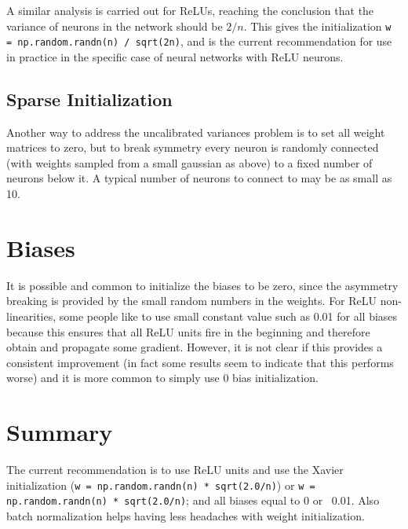 A similar analysis is carried out for ReLUs, reaching the conclusion that the variance of neurons in the network should be $2/n$. This gives the initialization \texttt{w = np.random.randn(n) / sqrt(2n)}, and is the current recommendation for use in practice in the specific case of neural networks with ReLU neurons.

\subsection*{Sparse Initialization}
Another way to address the uncalibrated variances problem is to set all weight matrices to zero, but to break symmetry every neuron is randomly connected (with weights sampled from a small gaussian as above) to a fixed number of neurons below it. A typical number of neurons to connect to may be as small as 10.

\section{Biases}
It is possible and common to initialize the biases to be zero, since the asymmetry breaking is provided by the small random numbers in the weights. For ReLU non-linearities, some people like to use small constant value such as 0.01 for all biases because this ensures that all ReLU units fire in the beginning and therefore obtain and propagate some gradient. However, it is not clear if this provides a consistent improvement (in fact some results seem to indicate that this performs worse) and it is more common to simply use 0 bias initialization.

\section*{Summary}
The current recommendation is to use ReLU units and use the Xavier initialization (\texttt{w = np.random.randn(n) * sqrt(2.0/n)}) or \texttt{w = np.random.randn(n) * sqrt(2.0/n)}; and all biases equal to 0 or ~0.01. Also batch normalization helps having less headaches with weight initialization.